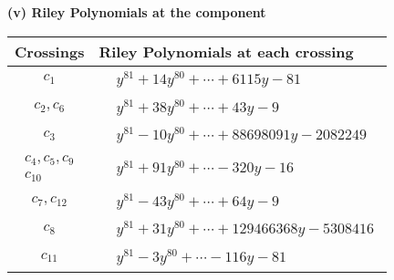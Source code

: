 \documentclass[1p]{elsarticle_modified}
\theoremstyle{definition}
\begin{document}
\newpage\renewcommand{\arraystretch}{1}
\flushleft \textbf{(v) Riley Polynomials at the component}\newline \\
\begin{tabular}{m{50pt}|m{274pt}}
Crossings & \hspace{64pt}Riley Polynomials at each crossing \\
\hline $$\begin{aligned}c_{1}\end{aligned}$$&$\begin{aligned}
&y^{81}+14 y^{80}+\cdots+6115 y-81
\end{aligned}$\\
\hline $$\begin{aligned}c_{2},c_{6}\end{aligned}$$&$\begin{aligned}
&y^{81}+38 y^{80}+\cdots+43 y-9
\end{aligned}$\\
\hline $$\begin{aligned}c_{3}\end{aligned}$$&$\begin{aligned}
&y^{81}-10 y^{80}+\cdots+88698091 y-2082249
\end{aligned}$\\
\hline $$\begin{aligned}c_{4},c_{5},c_{9}\\c_{10}\end{aligned}$$&$\begin{aligned}
&y^{81}+91 y^{80}+\cdots-320 y-16
\end{aligned}$\\
\hline $$\begin{aligned}c_{7},c_{12}\end{aligned}$$&$\begin{aligned}
&y^{81}-43 y^{80}+\cdots+64 y-9
\end{aligned}$\\
\hline $$\begin{aligned}c_{8}\end{aligned}$$&$\begin{aligned}
&y^{81}+31 y^{80}+\cdots+129466368 y-5308416
\end{aligned}$\\
\hline $$\begin{aligned}c_{11}\end{aligned}$$&$\begin{aligned}
&y^{81}-3 y^{80}+\cdots-116 y-81
\end{aligned}$\\
\hline
\end{tabular}\\~\\
\end{document}

